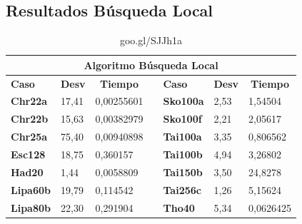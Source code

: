 \documentclass[a4paper, 12pt]{article}
\begin{document}
      
      \newpage
      \subsection{Resultados Búsqueda Local}
\begin{table}[H]
\centering
\caption{goo.gl/SJJh1a}
\label{my-label}
\begin{tabular}{|l|l|l|l|l|l|l|}
\hline
\multicolumn{7}{|c|}{\textbf{Algoritmo Búsqueda Local}}                                                                                                                                    \\ \hline
\textbf{Caso}    & \multicolumn{1}{c|}{\textbf{Desv}} & \multicolumn{1}{c|}{\textbf{Tiempo}} &  & \textbf{Caso}    & \multicolumn{1}{c|}{\textbf{Desv}} & \multicolumn{1}{c|}{\textbf{Tiempo}} \\ \cline{1-3} \cline{5-7} 
\textbf{Chr22a}  & 17,41                              & 0,00255601                           &  & \textbf{Sko100a} & 2,53                               & 1,54504                              \\ \cline{1-3} \cline{5-7} 
\textbf{Chr22b}  & 15,63                              & 0,00382979                           &  & \textbf{Sko100f} & 2,21                               & 2,05617                              \\ \cline{1-3} \cline{5-7} 
\textbf{Chr25a}  & 75,40                              & 0,00940898                           &  & \textbf{Tai100a} & 3,35                               & 0,806562                             \\ \cline{1-3} \cline{5-7} 
\textbf{Esc128}  & 18,75                              & 0,360157                             &  & \textbf{Tai100b} & 4,94                               & 3,26802                              \\ \cline{1-3} \cline{5-7} 
\textbf{Had20}   & 1,44                               & 0,0058809                            &  & \textbf{Tai150b} & 3,50                               & 24,8278                              \\ \cline{1-3} \cline{5-7} 
\textbf{Lipa60b} & 19,79                              & 0,114542                             &  & \textbf{Tai256c} & 1,26                               & 5,15624                              \\ \cline{1-3} \cline{5-7} 
\textbf{Lipa80b} & 22,30                              & 0,291904                             &  & \textbf{Tho40}   & 5,34                               & 0,0626425                            \\ \cline{1-3} \cline{5-7} 

\end{tabular}
\end{table}
\end{document}
